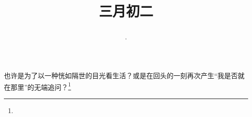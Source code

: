 \title{\date[d=10,m=4,y=2024][year:cn-y,年,month:cn,day:cn,日,·,weekday]·三月初二 }
也许是为了以一种恍如隔世的目光看生活？或是在回头的一刻再次产生“我是否就在那里”的无端追问？\footnote{ }

